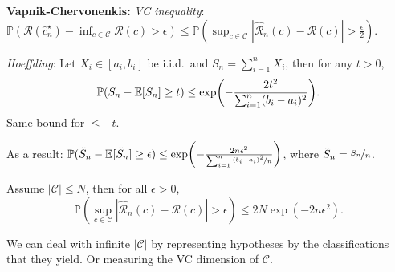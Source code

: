 \documentclass[9pt]{extarticle}
\newenvironment{topic}[1]
{\textbf{\sffamily \colorbox{black}{\rlap{\textbf{\textcolor{white}{#1}}}\hspace{\linewidth}\hspace{-2\fboxsep}}}}
{}
\newenvironment{subtopic}[1]
{\textbf{\sffamily #1:}}
{}
\begin{document}
\begin{multicols*}{3}
\begin{topic}{Statistical learning theory}
\begin{subtopic}{Vapnik-Chervonenkis}
            \textit{VC inequality}: $\mathbb{P}(\mathcal{R}(\hat{c}_n^\star) - \inf_{c \in \mathcal{C}} \mathcal{R}(c) > \epsilon) \leq \mathbb{P}(\sup_{c \in \mathcal{C}} |\hat{\mathcal{R}}_n(c) - \mathcal{R}(c)| > \frac{\epsilon}{2})$.

            \textit{Hoeffding}: Let $X_i \in [a_i, b_i]$ be i.i.d.\ and $S_n = \sum_{i=1}^{n} X_i$, then for any $t >
                0$, \[
                \mathbb{P}(S_n - \E[S_n] \geq t) \leq \exp \lft( -\frac{2t^2}{\sum_{i=1}^{n} (b_i - a_i)^2} \rgt).
            \]
            Same bound for $\leq -t$.

            As a result: $\mathbb{P}(\tilde{S}_n - \E[\tilde{S}_n] \geq \epsilon) \leq \exp \lft( -\frac{2n
                    \epsilon^2}{\sum_{i=1}^{n} \nicefrac{(b_i - a_i)^2}{n}} \rgt)$, where $\tilde{S}_n =
                \nicefrac{S_n}{n}$.

            Assume $|\mathcal{C}| \leq N$, then for all $\epsilon > 0$, \[
                \mathbb{P}(\sup_{c \in \mathcal{C}} |\hat{\mathcal{R}}_n(c) - \mathcal{R}(c)| > \epsilon) \leq 2N\exp(-2n \epsilon^2).
            \]

            We can deal with infinite $|\mathcal{C}|$ by representing hypotheses by the classifications that
            they yield. Or measuring the VC dimension of $\mathcal{C}$.

        \end{subtopic}

    \end{topic}

\end{multicols*}
\end{document}
